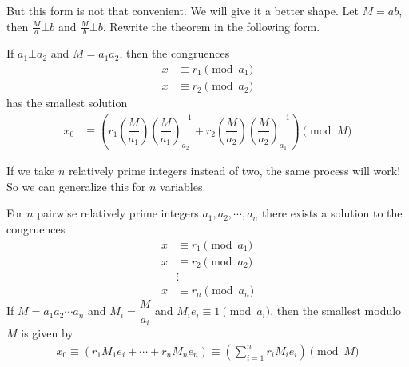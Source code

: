 \documentclass{subfile}
\begin{document}
	But this form is not that convenient. We will give it a better shape. Let $M=ab$, then $\frac{M}{a}\bot b$ and $\frac{M}{b}\bot b$. Rewrite the theorem in the following form.
		\begin{theorem}
			If $a_1\bot a_2$ and $M=a_1a_2$, then the congruences
			\begin{align*}
			x & \equiv r_1\pmod{a_1}\\
			x & \equiv r_2\pmod{a_2}
			\end{align*}
			has the smallest solution
			\begin{align*}
			x_0 & \equiv
			\left(r_1\left(\dfrac{M}{a_1}\right)\left(\dfrac{M}{a_1}\right)^{-1}_{a_2}+r_2\left(\dfrac{M}{a_2}\right)\left(\dfrac{M}{a_2}\right)^{-1}_{a_1}\right)\pmod{M}
			\end{align*}
		\end{theorem}
	If we take $n$ relatively prime integers instead of two, the same process will work! So we can generalize this for $n$ variables.
		\begin{theorem}[CRT]
			For $n$ pairwise relatively prime integers $a_1,a_2,\cdots,a_n$ there exists a solution to the congruences
				\begin{align*}
					x & \equiv r_1\pmod{a_1}\\
					x & \equiv r_2\pmod{a_2}\\
					   &\vdots\\
					x & \equiv r_n\pmod{a_n}
				\end{align*}
			If $M=a_1a_2\cdots a_n$ and $M_i=\dfrac{M}{a_i}$ and $M_ie_i\equiv1\pmod{a_i}$, then the smallest  modulo $M$ is given by
			\begin{align*}
			x_0  \equiv \left(r_1 M_1e_i+\cdots+r_n M_ne_n\right)\equiv \left(\sum_{i=1}^{n} r_i M_ie_i\right)\pmod M
			\end{align*}
		\end{theorem}
\end{document}

